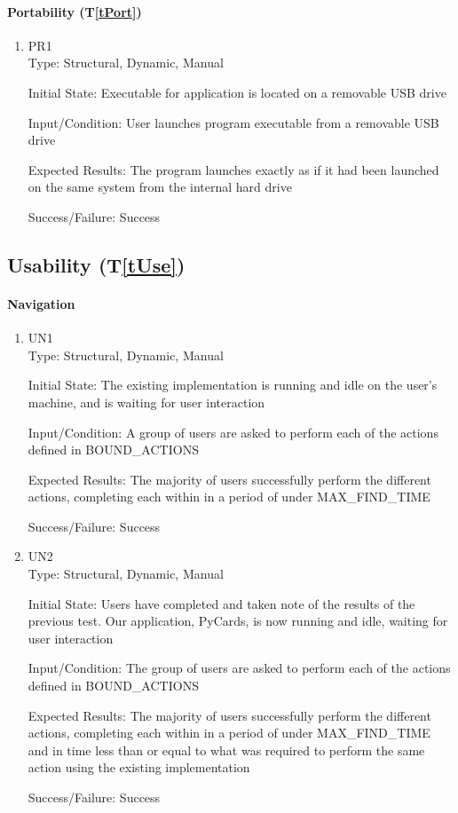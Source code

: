 \documentclass[12pt, titlepage]{article}
\newcommand{\tref}[1]{T\ref{#1}}
\begin{document}
	\paragraph{Portability (\tref{tPort})}
	\begin{enumerate}
		\item{PR1\\}
		Type: Structural, Dynamic, Manual
		
		Initial State: Executable for application is located on a removable USB drive
		
		Input/Condition: User launches program executable from a removable USB drive
		
		Expected Results: The program launches exactly as if it had been launched on
		the same system from the internal hard drive

		Success/Failure: Success
	\end{enumerate}

	\subsection{Usability (\tref{tUse})}
	\paragraph{Navigation}
	\begin{enumerate}
	\item{UN1\\}
		Type: Structural, Dynamic, Manual
		
		Initial State: The existing implementation is running and idle on the user's
		machine, and is waiting for user interaction
		
		Input/Condition: A group of users are asked to perform each of the actions
		defined in BOUND\_ACTIONS
		
		Expected Results: The majority of users successfully perform the different
		actions, completing each within in a period of under MAX\_FIND\_TIME

		Success/Failure: Success

		\item{UN2\\}
		Type: Structural, Dynamic, Manual
		
		Initial State: Users have completed and taken note of the results of the
		previous test. Our application, PyCards, is now running and idle, waiting for
		user interaction
		
		Input/Condition: The group of users are asked to perform each of the actions
		defined in BOUND\_ACTIONS
		
		Expected Results: The majority of users successfully perform the different
		actions, completing each within in a period of under MAX\_FIND\_TIME and in
		time less than or equal to what was required to perform the same action using
		the existing implementation

		Success/Failure: Success
	\end{enumerate}
\end{document}
